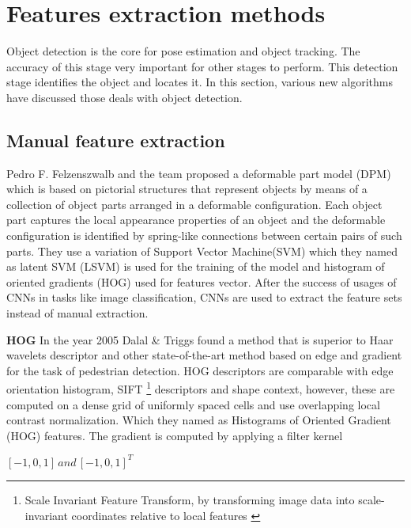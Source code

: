 \section{Features extraction methods}
Object detection \cite{felzenszwalb2009object, walk2010new, liu2016ssd, szegedy2014scalable, dollar2009pedestrian, dollar2011pedestrian} is the core for pose estimation and object tracking. The accuracy of this stage very important for other stages to perform. This detection stage identifies the object and locates it. In this section, various new algorithms have discussed those deals with object detection.

\subsection{Manual feature extraction}
Pedro F. Felzenszwalb and the team proposed a deformable part model (DPM) \cite{felzenszwalb2009object} which is based on pictorial structures that represent objects by means of a collection of object parts arranged in a deformable configuration. Each object part captures the local appearance properties of
an object and the deformable configuration is identified by spring-like connections between certain pairs of such parts. They use a variation of Support Vector Machine(SVM) which they named as latent SVM (LSVM) is used for the training of the model and  histogram of oriented gradients (HOG) used for features vector. After the success of usages of CNNs in tasks like image classification, CNNs are used to extract the feature sets instead of manual extraction.

\newpara \textbf{HOG }
In the year 2005 Dalal \& Triggs found a method that is superior to Haar wavelets descriptor and other state-of-the-art method based on edge and gradient for the task of pedestrian detection. HOG descriptors are comparable with edge orientation histogram, SIFT \footnote{Scale Invariant Feature Transform, by transforming image data into scale-invariant coordinates relative to local features \cite{lowe2004distinctive}} descriptors and shape context, however, these are computed on a dense grid of uniformly spaced cells and use overlapping local contrast normalization. Which they named as Histograms of Oriented Gradient (HOG) features\cite{dalal2005histograms}. The gradient is computed by applying a filter kernel \\
\begin{center}
$[-1,0,1] \, and \, [-1,0,1] ^{T}$
\end{center}

